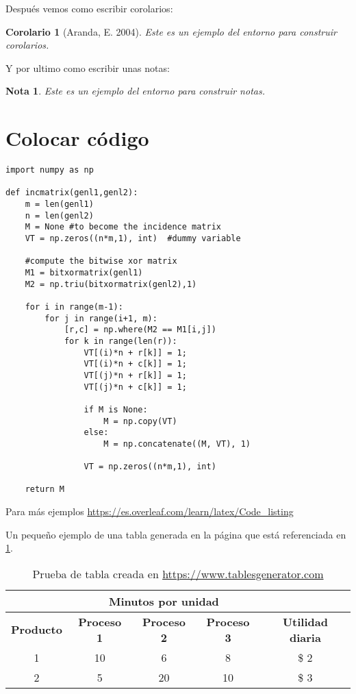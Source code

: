 \documentclass[12pt]{article}
\begin{document}
Después vemos como escribir corolarios:
\newtheorem{col}{Corolario}[thm]
\begin{col}[Aranda, E. 2004]
Este es un ejemplo del entorno
para construir corolarios.
\end{col}

Y por ultimo como escribir unas notas:
\newtheorem{rmk}{Nota}[section]
\begin{rmk}
Este es un ejemplo del entorno
para construir notas.
\end{rmk}

\section*{Colocar código}

\begin{lstlisting}
import numpy as np
    
def incmatrix(genl1,genl2):
    m = len(genl1)
    n = len(genl2)
    M = None #to become the incidence matrix
    VT = np.zeros((n*m,1), int)  #dummy variable
    
    #compute the bitwise xor matrix
    M1 = bitxormatrix(genl1)
    M2 = np.triu(bitxormatrix(genl2),1) 

    for i in range(m-1):
        for j in range(i+1, m):
            [r,c] = np.where(M2 == M1[i,j])
            for k in range(len(r)):
                VT[(i)*n + r[k]] = 1;
                VT[(i)*n + c[k]] = 1;
                VT[(j)*n + r[k]] = 1;
                VT[(j)*n + c[k]] = 1;
                
                if M is None:
                    M = np.copy(VT)
                else:
                    M = np.concatenate((M, VT), 1)
                
                VT = np.zeros((n*m,1), int)
    
    return M
\end{lstlisting}

Para más ejemplos \url{https://es.overleaf.com/learn/latex/Code_listing}

\newpage
Un pequeño ejemplo de una tabla generada en la página que está referenciada en \ref{tab:mi_tabla}.

\begin{table}[ht]
\centering
\begin{tabular}{ccccc}
& \multicolumn{3}{c}{\textbf{Minutos por unidad}} &  \\ \hline
\rowcolor[HTML]{EFEFEF} 
\textbf{Producto} & \textbf{Proceso 1} & \textbf{Proceso 2} & \textbf{Proceso 3} & \textbf{Utilidad diaria} \\ \hline
1 & 10 & 6 & 8 & \$ 2 \\
2 & 5 & 20 & 10 & \$ 3 \\ \hline
\end{tabular}
\caption{Prueba de tabla creada en \url{https://www.tablesgenerator.com}}
\label{tab:mi_tabla}
\end{table}
\end{document}

